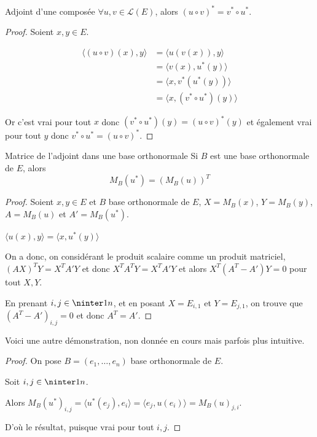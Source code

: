 \begin{proposition}{Adjoint d'une composée}{}
    $\forall u, v \in \mathscr L(E)$, alors $(u \circ v)^* = v^* \circ u^*$.
\end{proposition}


\begin{proof}
    Soient $x, y \in E$. 

    \begin{align}
        \langle (u \circ v)(x), y \rangle & = \langle u(v(x)), y \rangle \\
        & = \langle v(x), u^*(y) \rangle \\
        & = \langle x, v^*(u^*(y)) \rangle \\
        & = \langle x, (v^* \circ u^*)(y) \rangle
    \end{align}

    Or c'est vrai pour tout $x$ donc $(v^* \circ u^*)(y) = (u \circ v)^*(y)$ et 
    également vrai pour tout $y$ donc $v^* \circ u^* = (u \circ v)^*$.
\end{proof}

\begin{proposition}{Matrice de l'adjoint dans une base orthonormale}{}
    Si $B$ est une base orthonormale de $E$, alors 
    $$M_B(u^*) = (M_B(u))^T$$
\end{proposition}

\begin{proof}
    Soient $x, y \in E$ et $B$ base orthonormale de $E$, $X = M_B(x)$, $Y = M_B(y)$, 
    $A = M_B(u)$ et $A' = M_B(u^*)$.

    $\langle u(x), y \rangle = \langle x, u^*(y) \rangle$ 

    On a donc, on considérant le produit scalaire comme un produit matriciel, 
    $(AX)^T Y = X^T A' Y$ et donc $X^T A^T Y = X^T A' Y$ 
    et alors $X^T(A^T - A') Y = 0$ pour tout $X, Y$.

    En prenant $i, j \in \ninter 1 n$, et en posant $X = E_{i, 1}$ et $Y = E_{j, 1}$, 
    on trouve que $(A^T - A')_{i, j} = 0$ et donc $A^T = A'$.

\end{proof}

Voici une autre démonstration, non donnée en cours mais parfois plus intuitive.

\begin{proof}
    On pose $B = (e_1, \dots, e_n)$ base orthonormale de $E$.

    Soit $i, j \in \ninter 1 n$. 

    Alors $M_B(u^*)_{i, j} = \langle u^*(e_j), e_i \rangle = \langle e_j, u(e_i) \rangle = M_B(u)_{j, i}$.

    D'où le résultat, puisque vrai pour tout $i, j$.
\end{proof}

